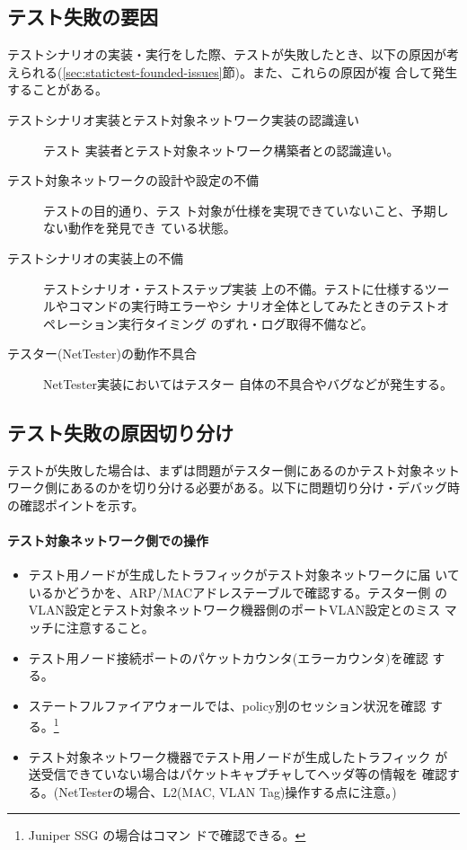   \subsection{テスト失敗の要因}
テストシナリオの実装・実行をした際、テストが失敗したとき、以下の原因が考
えられる(\ref{sec:statictest-founded-issues}節)。また、これらの原因が複
合して発生することがある。
\begin{description}
 \item[テストシナリオ実装とテスト対象ネットワーク実装の認識違い] テスト
            実装者とテスト対象ネットワーク構築者との認識違い。
 \item[テスト対象ネットワークの設計や設定の不備] テストの目的通り、テス
            ト対象が仕様を実現できていないこと、予期しない動作を発見でき
            ている状態。
 \item[テストシナリオの実装上の不備] テストシナリオ・テストステップ実装
            上の不備。テストに仕様するツールやコマンドの実行時エラーやシ
            ナリオ全体としてみたときのテストオペレーション実行タイミング
            のずれ・ログ取得不備など。
 \item[テスター(NetTester)の動作不具合] NetTester実装においてはテスター
            自体の不具合やバグなどが発生する。
\end{description}

  \subsection{テスト失敗の原因切り分け}

テストが失敗した場合は、まずは問題がテスター側にあるのかテスト対象ネット
ワーク側にあるのかを切り分ける必要がある。以下に問題切り分け・デバッグ時
の確認ポイントを示す。

    \paragraph{テスト対象ネットワーク側での操作}

\begin{itemize}
 \item テスト用ノードが生成したトラフィックがテスト対象ネットワークに届
       いているかどうかを、ARP/MACアドレステーブルで確認する。テスター側
       のVLAN設定とテスト対象ネットワーク機器側のポートVLAN設定とのミス
       マッチに注意すること。
 \item テスト用ノード接続ポートのパケットカウンタ(エラーカウンタ)を確認
       する。
 \item ステートフルファイアウォールでは、policy別のセッション状況を確認
       する。\footnote{Juniper SSG の場合はコマン
       ドで確認できる。}
 \item テスト対象ネットワーク機器でテスト用ノードが生成したトラフィック
       が送受信できていない場合はパケットキャプチャしてヘッダ等の情報を
       確認する。(NetTesterの場合、L2(MAC, VLAN Tag)操作する点に注意。)
\end{itemize}

